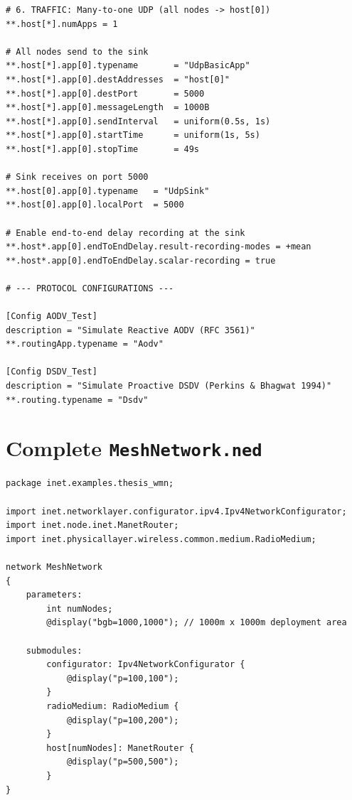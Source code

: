 \begin{lstlisting}[caption={Complete \texttt{omnetpp.ini} simulation configuration.},
                   label={lst:omnetpp_ini}]
# 6. TRAFFIC: Many-to-one UDP (all nodes -> host[0])
**.host[*].numApps = 1

# All nodes send to the sink
**.host[*].app[0].typename       = "UdpBasicApp"
**.host[*].app[0].destAddresses  = "host[0]"
**.host[*].app[0].destPort       = 5000
**.host[*].app[0].messageLength  = 1000B
**.host[*].app[0].sendInterval   = uniform(0.5s, 1s)
**.host[*].app[0].startTime      = uniform(1s, 5s)
**.host[*].app[0].stopTime       = 49s

# Sink receives on port 5000
**.host[0].app[0].typename   = "UdpSink"
**.host[0].app[0].localPort  = 5000

# Enable end-to-end delay recording at the sink
**.host*.app[0].endToEndDelay.result-recording-modes = +mean
**.host*.app[0].endToEndDelay.scalar-recording = true

# --- PROTOCOL CONFIGURATIONS ---

[Config AODV_Test]
description = "Simulate Reactive AODV (RFC 3561)"
**.routingApp.typename = "Aodv"

[Config DSDV_Test]
description = "Simulate Proactive DSDV (Perkins & Bhagwat 1994)"
**.routing.typename = "Dsdv"
\end{lstlisting}

\section{Complete \texttt{MeshNetwork.ned}}
\label{app:ned}

\begin{lstlisting}[caption={\texttt{MeshNetwork.ned} --- network definition file.},
                   label={lst:ned}]
package inet.examples.thesis_wmn;

import inet.networklayer.configurator.ipv4.Ipv4NetworkConfigurator;
import inet.node.inet.ManetRouter;
import inet.physicallayer.wireless.common.medium.RadioMedium;

network MeshNetwork
{
    parameters:
        int numNodes;
        @display("bgb=1000,1000"); // 1000m x 1000m deployment area

    submodules:
        configurator: Ipv4NetworkConfigurator {
            @display("p=100,100");
        }
        radioMedium: RadioMedium {
            @display("p=100,200");
        }
        host[numNodes]: ManetRouter {
            @display("p=500,500");
        }
}
\end{lstlisting}
